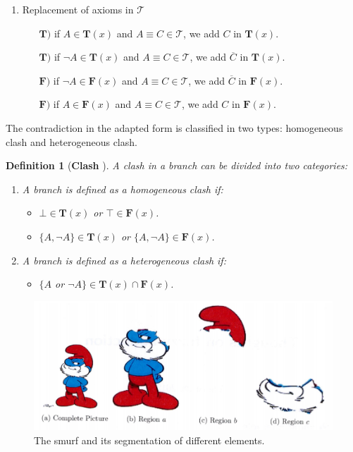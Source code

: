 \documentclass{article}
\newtheorem{mydef}{Definition}
\begin{document}
\begin{enumerate}
	 \item Replacement of axioms in $\mathcal{T}$
	       \begin{itemize}
	        \item  [$\mathbf{T)}$] if $A \in \mathbf{T}(x)$ and $A \equiv C \in \mathcal{T}$, we add $C$ in $\mathbf{T}(x)$.
		\item  [$\mathbf{T)}$] if $ \neg A \in \mathbf{T}(x)$ and $A \equiv C \in \mathcal{T}$, we add $\overline{C}$ in $\mathbf{T}(x)$.
	        \item  [$\mathbf{F)}$] if $ \neg A \in \mathbf{F}(x)$ and $A \equiv C \in \mathcal{T}$, we add $\overline{C}$ in $\mathbf{F}(x)$. 	
	        \item  [$\mathbf{F)}$] if $ A \in \mathbf{F}(x)$ and $A \equiv C \in \mathcal{T}$, we add $C$ in $\mathbf{F}(x)$.
	       \end{itemize}     
\end{enumerate}

The contradiction in the adapted form is classified in two types: homogeneous clash and heterogeneous clash. 
\begin{mydef}[\textbf{Clash} \cite{colucci2004uniform}]
A clash in a branch can be divided into two categories:
\begin{enumerate}
	 \item A branch is defined as a homogeneous clash if:
	       \begin{itemize}
	        \item  $\bot \in \mathbf{T}(x)$ or $\top \in \mathbf{F}(x)$.
	        \item  $\{A,\neg A\} \in \mathbf{T}(x)$ or $\{A,\neg A\} \in \mathbf{F}(x)$.
		\end{itemize}
	 \item A branch is defined as a heterogeneous clash if:
	       \begin{itemize}
	        \item   $\{A$ or $\neg A\} \in \mathbf{T}(x) \cap \mathbf{F}(x)$. 
	       \end{itemize}     
\end{enumerate}
\label{clash}
\end{mydef}

\begin{figure}[h]
  \centering
   \includegraphics[scale=.3]{./figures/smurf.png}
   \caption{\label{fig:smurf}The smurf and its segmentation of different elements.}
 \end{figure} 
 
\end{document}
